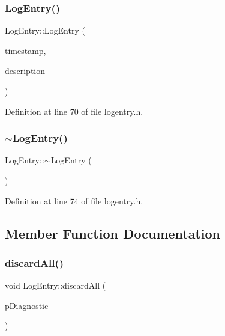 \subsubsection{\texorpdfstring{Log\+Entry()}{LogEntry()}\hspace{0.1cm}{\footnotesize\ttfamily [2/2]}}
{\footnotesize\ttfamily Log\+Entry\+::\+Log\+Entry (\begin{DoxyParamCaption}\item[{nsecs\+\_\+t}]{timestamp,  }\item[{String8}]{description }\end{DoxyParamCaption})}



Definition at line 70 of file logentry.\+h.


\begin{DoxyCode}{0}
\end{DoxyCode}
\mbox{\label{classLogEntry_ae0da106e665ca859be1a30ea316cd7d2}} 
\subsubsection{\texorpdfstring{$\sim$\+Log\+Entry()}{~LogEntry()}}
{\footnotesize\ttfamily Log\+Entry\+::$\sim$\+Log\+Entry (\begin{DoxyParamCaption}{ }\end{DoxyParamCaption})}



Definition at line 74 of file logentry.\+h.


\begin{DoxyCode}{0}
\end{DoxyCode}


\subsection{Member Function Documentation}
\mbox{\label{classLogEntry_ab914112fadd8cd8cf47a4e1e9e09fa72}} 
\subsubsection{\texorpdfstring{discard\+All()}{discardAll()}}
{\footnotesize\ttfamily void Log\+Entry\+::discard\+All (\begin{DoxyParamCaption}\item[{sp$<$ \mbox{\hyperlink{classhwcomposer_1_1IDiagnostic}{I\+Diagnostic}} $>$}]{p\+Diagnostic }\end{DoxyParamCaption})\hspace{0.3cm}{\ttfamily [static]}}



